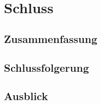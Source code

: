 \chapter{Schluss}
\label{chap:schluss}
\section{Zusammenfassung}%
\label{sec:zusammenfassung}
\section{Schlussfolgerung}%
\label{sec:achlussfolgerung}
\section{Ausblick}%
\label{sec:ausblickC}

